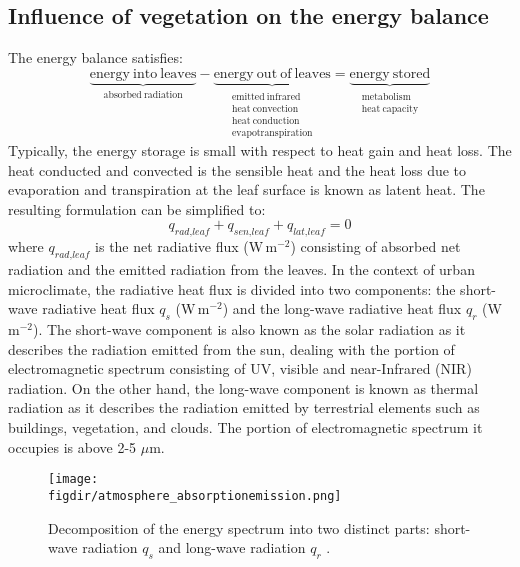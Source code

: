 \subsection{Influence of vegetation on the energy balance}

The energy balance satisfies:
\begin{equation}
\underbrace{\mathrm{energy\ into\ leaves}}_{\mathrm{absorbed\ radiation}}
- \underbrace{\mathrm{energy\ out\ of\ leaves} }_{\substack{\mathrm{emitted\ infrared}\\\mathrm{heat\ convection}\\\mathrm{heat\ conduction}\\\mathrm{evapotranspiration}}} = \underbrace{\mathrm{energy\ stored}}_{\substack{\mathrm{metabolism}\\\mathrm{heat\ capacity}}}
\end{equation}
Typically, the energy storage is small with respect to heat gain and heat loss. The heat conducted and convected is the sensible heat and the heat loss due to evaporation and transpiration at the leaf surface is known as latent heat. The resulting formulation can be simplified to:
\begin{equation}
q_{\textit{rad,leaf}} + q_{\textit{sen,leaf}} + q_{\textit{lat,leaf}} = 0
\end{equation}
where $q_{\textit{rad,leaf}}$ is the net radiative flux (W\,m$^{-2}$) consisting of absorbed net radiation and the emitted radiation from the leaves. In the context of urban microclimate, the radiative heat flux is divided into two components: the short-wave radiative heat flux $q_{s}$ (W\,m$^{-2}$) and the long-wave radiative heat flux $q_{r}$ (W\,m$^{-2}$). The short-wave component is also known as the solar radiation as it describes the radiation emitted from the sun, dealing with the portion of electromagnetic spectrum consisting of UV, visible and near-Infrared (NIR) radiation. On the other hand, the long-wave component is known as thermal radiation as it describes the radiation emitted by terrestrial elements such as buildings, vegetation, and clouds. The portion of electromagnetic spectrum it occupies is above 2-5 $\mu$m. 

\begin{figure}[t]
	\centering
	\texttt{[image: \\figdir/atmosphere\_absorptionemission.png]}
	\caption{Decomposition of the energy spectrum into two distinct parts: short-wave radiation $q_{s}$ and long-wave radiation $q_{r}$ \citep{Oke2017a}.}
	\label{fig:atmosphere_absorptionemission}
\end{figure}

